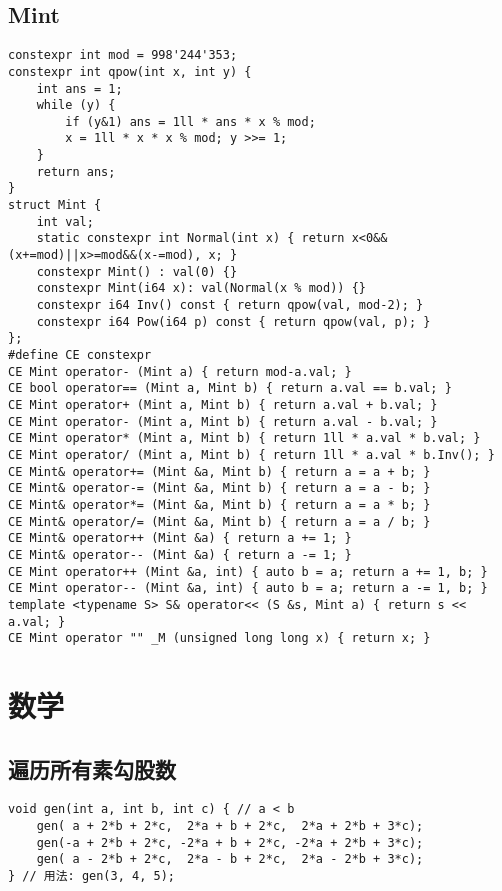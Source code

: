 \documentclass[a4paper,landscape,twocolumn]{ctexart}
\begin{document}
\subsection{Mint}

\begin{lstlisting}[]
constexpr int mod = 998'244'353;
constexpr int qpow(int x, int y) {
	int ans = 1;
	while (y) {
		if (y&1) ans = 1ll * ans * x % mod;
		x = 1ll * x * x % mod; y >>= 1;
	}
	return ans;
}
struct Mint {
	int val;
	static constexpr int Normal(int x) { return x<0&&(x+=mod)||x>=mod&&(x-=mod), x; }
	constexpr Mint() : val(0) {}
	constexpr Mint(i64 x): val(Normal(x % mod)) {}
	constexpr i64 Inv() const { return qpow(val, mod-2); }
	constexpr i64 Pow(i64 p) const { return qpow(val, p); }
};
#define CE constexpr
CE Mint operator- (Mint a) { return mod-a.val; }
CE bool operator== (Mint a, Mint b) { return a.val == b.val; }
CE Mint operator+ (Mint a, Mint b) { return a.val + b.val; }
CE Mint operator- (Mint a, Mint b) { return a.val - b.val; }
CE Mint operator* (Mint a, Mint b) { return 1ll * a.val * b.val; }
CE Mint operator/ (Mint a, Mint b) { return 1ll * a.val * b.Inv(); }
CE Mint& operator+= (Mint &a, Mint b) { return a = a + b; }
CE Mint& operator-= (Mint &a, Mint b) { return a = a - b; }
CE Mint& operator*= (Mint &a, Mint b) { return a = a * b; }
CE Mint& operator/= (Mint &a, Mint b) { return a = a / b; }
CE Mint& operator++ (Mint &a) { return a += 1; }
CE Mint& operator-- (Mint &a) { return a -= 1; }
CE Mint operator++ (Mint &a, int) { auto b = a; return a += 1, b; }
CE Mint operator-- (Mint &a, int) { auto b = a; return a -= 1, b; }
template <typename S> S& operator<< (S &s, Mint a) { return s << a.val; }
CE Mint operator "" _M (unsigned long long x) { return x; }
\end{lstlisting}

\section{数学}

\subsection{遍历所有素勾股数}

\begin{lstlisting}
void gen(int a, int b, int c) { // a < b
    gen( a + 2*b + 2*c,  2*a + b + 2*c,  2*a + 2*b + 3*c);
    gen(-a + 2*b + 2*c, -2*a + b + 2*c, -2*a + 2*b + 3*c);
    gen( a - 2*b + 2*c,  2*a - b + 2*c,  2*a - 2*b + 3*c);
} // 用法: gen(3, 4, 5);
\end{lstlisting}
\end{document}
